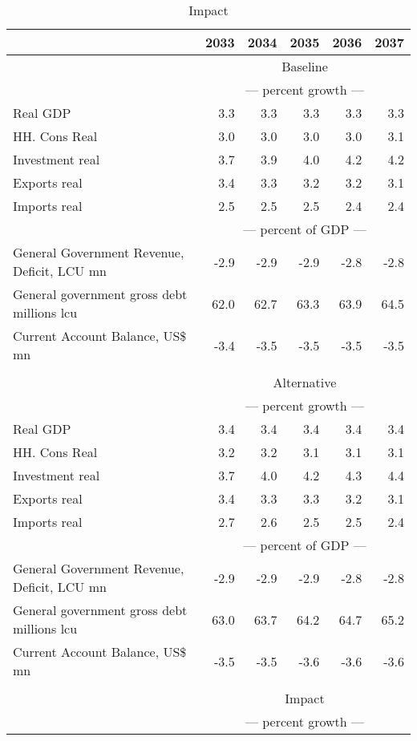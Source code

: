 \documentclass{article}
\begin{document}
 \begin{table}[ht]
\caption{Impact}
\begin{tabular}{lrrrrr}
\toprule
 & 2033 & 2034 & 2035 & 2036 & 2037 \\
\midrule
&\multicolumn{5}{c}{Baseline}           \\
&\multicolumn{5}{c}{--- percent growth ---}           \\
Real GDP & 3.3 & 3.3 & 3.3 & 3.3 & 3.3 \\
HH. Cons Real & 3.0 & 3.0 & 3.0 & 3.0 & 3.1 \\
Investment real & 3.7 & 3.9 & 4.0 & 4.2 & 4.2 \\
Exports real & 3.4 & 3.3 & 3.2 & 3.2 & 3.1 \\
Imports real & 2.5 & 2.5 & 2.5 & 2.4 & 2.4 \\
&\multicolumn{5}{c}{--- percent of GDP ---}           \\
General Government Revenue, Deficit, LCU mn & -2.9 & -2.9 & -2.9 & -2.8 & -2.8 \\
General government gross debt millions lcu & 62.0 & 62.7 & 63.3 & 63.9 & 64.5 \\
Current Account Balance, US\$ mn & -3.4 & -3.5 & -3.5 & -3.5 & -3.5 \\
&\multicolumn{5}{c}{ }           \\
&\multicolumn{5}{c}{Alternative}           \\
&\multicolumn{5}{c}{--- percent growth ---}           \\
Real GDP & 3.4 & 3.4 & 3.4 & 3.4 & 3.4 \\
HH. Cons Real & 3.2 & 3.2 & 3.1 & 3.1 & 3.1 \\
Investment real & 3.7 & 4.0 & 4.2 & 4.3 & 4.4 \\
Exports real & 3.4 & 3.3 & 3.3 & 3.2 & 3.1 \\
Imports real & 2.7 & 2.6 & 2.5 & 2.5 & 2.4 \\
&\multicolumn{5}{c}{--- percent of GDP ---}           \\
General Government Revenue, Deficit, LCU mn & -2.9 & -2.9 & -2.9 & -2.8 & -2.8 \\
General government gross debt millions lcu & 63.0 & 63.7 & 64.2 & 64.7 & 65.2 \\
Current Account Balance, US\$ mn & -3.5 & -3.5 & -3.6 & -3.6 & -3.6 \\
&\multicolumn{5}{c}{ }           \\
&\multicolumn{5}{c}{Impact}           \\
&\multicolumn{5}{c}{--- percent growth ---}           \\

\end{tabular}
\end{table}
\end{document}
